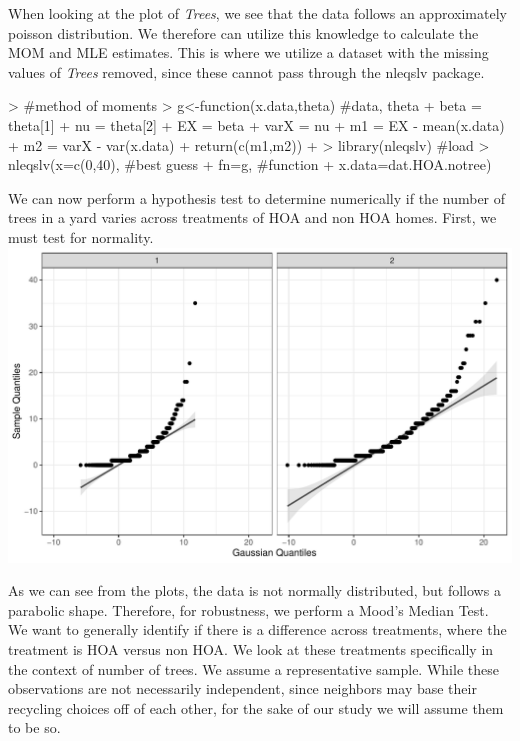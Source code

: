 \documentclass{article}
\begin{document}
When looking at the plot of \textit{Trees}, we see that the data follows an approximately poisson distribution. We therefore can utilize this knowledge to calculate the MOM and MLE estimates. This is where we utilize a dataset with the missing values of \textit{Trees} removed, since these cannot pass through the nleqslv \citep{nleqslv} package. 

\begin{Schunk}
\begin{Sinput}
> #method of moments
> g<-function(x.data,theta) {#data, theta
+   beta = theta[1]
+   nu = theta[2]
+   EX = beta
+   varX = nu
+   m1 = EX - mean(x.data)
+   m2 = varX - var(x.data)
+   return(c(m1,m2))
+ } 
> library(nleqslv) #load 
> nleqslv(x=c(0,40), #best guess
+         fn=g, #function
+         x.data=dat.HOA.notree)
\end{Sinput}
\end{Schunk}

We can now perform a hypothesis test to determine numerically if the number of trees in a yard varies across treatments of HOA and non HOA homes. First, we must test for normality. 
\newline
\includegraphics{part2-020}

As we can see from the plots, the data is not normally distributed, but follows a parabolic shape. Therefore, for robustness, we perform a Mood's Median Test. We want to generally identify if there is a difference across treatments, where the treatment is HOA versus non HOA. We look at these treatments specifically in the context of number of trees. We assume a representative sample. While these observations are not necessarily independent, since neighbors may base their recycling choices off of each other, for the sake of our study we will assume them to be so.
\end{document}
